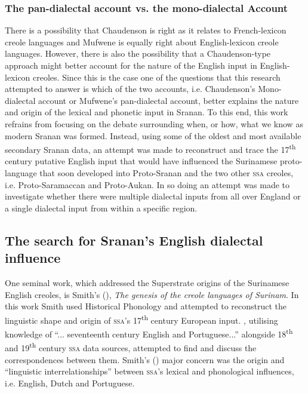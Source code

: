 \subsubsection {The pan-dialectal account vs. the mono-dialectal Account}\label{2.2.4.3}
There is a possibility that Chaudenson is right as it relates to French-lexicon creole languages and Mufwene is equally right about English-lexicon creole languages. However, there is also the possibility that a Chaudenson-type approach might better account for the nature of the English input in English-lexicon creoles. Since this is the case one of the questions that this research attempted to answer is which of the two accounts, i.e. Chaudenson's Mono-dialectal account or Mufwene's pan-dialectal account, better explains the nature and origin of the lexical and phonetic input in Sranan. To this end, this work refrains from focusing on the debate surrounding when, or how, what we know as modern Sranan was formed. Instead, using some of the oldest and most available secondary Sranan data, an attempt was made to reconstruct and trace the 17\textsuperscript{th} century putative English input that would have influenced the Surinamese proto-language that soon developed into Proto-Sranan and the two other \textsc{ssa} creoles, i.e. Proto-Saramaccan and Proto-Aukan. In so doing an attempt was made to investigate whether there were multiple dialectal inputs from all over England or a single dialectal input from within a specific region.

\subsection{The search for Sranan's English dialectal influence}
One seminal work, which addressed the Superstrate origins of the Surinamese English creoles, is Smith's (\citeyear{Smith87}), \textit{The genesis of the creole languages of Surinam}. In this work Smith used Historical Phonology and attempted to reconstruct the linguistic shape and origin of \textsc{ssa}'s 17\textsuperscript{th} century European input.  \citet[6]{Smith87}, utilising knowledge of  ``... seventeenth century English and Portuguese...'' alongside 18\textsuperscript{th} and 19\textsuperscript{th} century \textsc{ssa} data sources, attempted to find and discuss the correspondences between them. Smith's (\citeyear{Smith87}) major concern was the origin and ``linguistic interrelationships'' between \textsc{ssa}'s lexical and phonological influences, i.e. English, Dutch and Portuguese.

